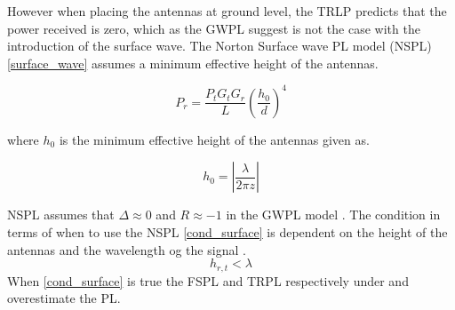 

However when placing the antennas at ground level, the TRLP predicts that the power received is zero, which as the GWPL suggest is not the case with the introduction of the surface wave. The Norton Surface wave PL model (NSPL)\eqref{surface_wave} assumes a minimum effective height of the antennas. 

\begin{equation}
P_r=\frac{P_t G_t G_r }{L}\left(\frac{h_0}{d}\right)^4
\label{surface_wave}
\end{equation}

where $h_0$ is the minimum effective height of the antennas given as. 

\begin{equation}
h_{0} = \left|\frac{\lambda}{2\pi z}\right|
\label{h_0}
\end{equation}

NSPL assumes that $\Delta \approx 0$ and $R\approx -1$ in the GWPL model \cite{Chong}. The condition in terms of when to use the NSPL \eqref{cond_surface} is dependent on the height of the antennas and the wavelength og the signal \cite{Chong}.
\begin{equation}
h_{r,t} < \lambda
\label{cond_surface}
\end{equation}
When \eqref{cond_surface} is true the FSPL and TRPL respectively under and overestimate the PL.

